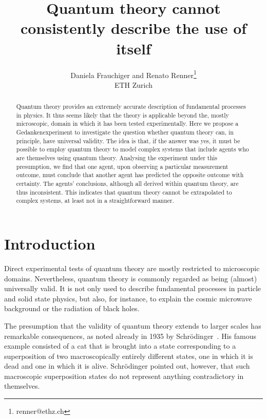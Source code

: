 \documentclass[12pt]{article}
\theoremstyle{mystyle}
\theoremstyle{definition}
\begin{document}
\title{Quantum theory cannot consistently describe the use of itself}

\author{Daniela Frauchiger and Renato Renner\thanks{renner@ethz.ch} \\[1ex]
ETH Zurich}

\date{}


\maketitle

\begin{abstract}
Quantum theory provides an extremely accurate description of fundamental processes in physics. It thus seems likely that the theory is applicable beyond the, mostly microscopic, domain in which it has been tested experimentally.  Here we propose a Gedankenexperiment to investigate the question whether quantum theory can, in principle, have universal validity. The idea is that, if the answer was yes, it must be possible to employ quantum theory  to model complex systems that include agents who are themselves using quantum theory.  Analysing the experiment under this presumption, we find that one agent, upon observing a particular measurement outcome, must conclude that another agent has predicted the opposite outcome with certainty. The agents' conclusions, although all derived within quantum theory, are thus inconsistent.  This indicates that quantum theory cannot be extrapolated to complex systems, at least not in a straightforward manner.
\end{abstract}


\section{Introduction} \label{sec_intro}

Direct experimental tests of quantum theory are mostly restricted to microscopic domains. Nevertheless, quantum theory is  commonly regarded as being (almost) universally valid. It is not only used to describe fundamental processes in particle and solid state physics, but also, for instance, to explain the cosmic microwave background or the radiation of black holes. 

The presumption that the validity of quantum theory extends to larger scales has remarkable consequences, as noted already in 1935 by  Schr\"odinger~\cite{Schroedinger35}. His famous example consisted of a cat that is brought into a state corresponding to a superposition of two macroscopically entirely different states, one in which it is dead and one in which it is alive.  Schr\"odinger pointed out, however, that such macroscopic superposition states do not represent anything contradictory in themselves. 
\end{document}
